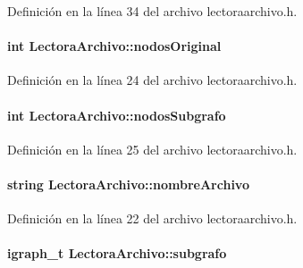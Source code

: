 Definición en la línea 34 del archivo lectoraarchivo.\-h.

\hypertarget{class_lectora_archivo_a2a7a807314562f857808b015685335ba}{
\paragraph[{nodos\-Original}]{\setlength{\rightskip}{0pt plus 5cm}int Lectora\-Archivo\-::nodos\-Original\hspace{0.3cm}{\ttfamily [private]}}}\label{class_lectora_archivo_a2a7a807314562f857808b015685335ba}


Definición en la línea 24 del archivo lectoraarchivo.\-h.

\hypertarget{class_lectora_archivo_a2eaf25b97a022e0247cefc7109d0e522}{
\paragraph[{nodos\-Subgrafo}]{\setlength{\rightskip}{0pt plus 5cm}int Lectora\-Archivo\-::nodos\-Subgrafo\hspace{0.3cm}{\ttfamily [private]}}}\label{class_lectora_archivo_a2eaf25b97a022e0247cefc7109d0e522}


Definición en la línea 25 del archivo lectoraarchivo.\-h.

\hypertarget{class_lectora_archivo_ac3cddfb1afc543a82eb72efbc80b501f}{
\paragraph[{nombre\-Archivo}]{\setlength{\rightskip}{0pt plus 5cm}string Lectora\-Archivo\-::nombre\-Archivo\hspace{0.3cm}{\ttfamily [private]}}}\label{class_lectora_archivo_ac3cddfb1afc543a82eb72efbc80b501f}


Definición en la línea 22 del archivo lectoraarchivo.\-h.

\hypertarget{class_lectora_archivo_ab04363a5dd47b71aac4922912bf0c9c1}{
\paragraph[{subgrafo}]{\setlength{\rightskip}{0pt plus 5cm}igraph\-\_\-t Lectora\-Archivo\-::subgrafo\hspace{0.3cm}{\ttfamily [private]}}}\label{class_lectora_archivo_ab04363a5dd47b71aac4922912bf0c9c1}


